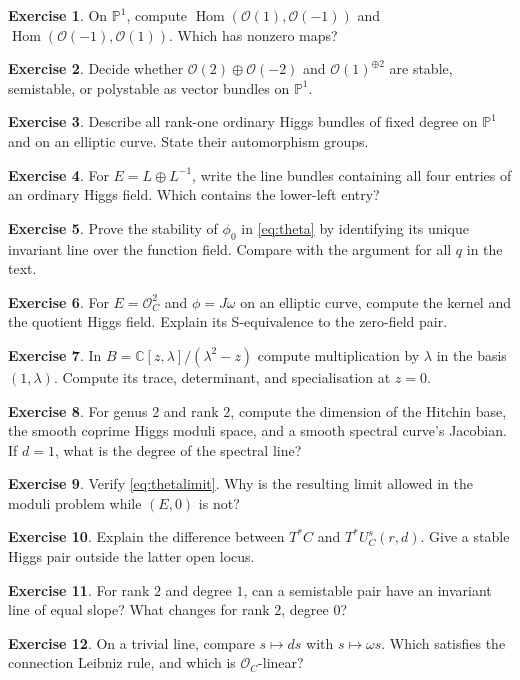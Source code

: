 \documentclass[11pt,a4paper]{article}
\numberwithin{equation}{section}
\theoremstyle{definition}
\newtheorem{exercise}{Exercise}
\newcommand{\OO}{\mathcal O}
\newcommand{\PP}{\mathbb P}
\newcommand{\Hom}{\operatorname{Hom}}
\begin{document}
\begin{exercise}\label{ex:hom}
On $\PP^1$, compute $\Hom(\OO(1),\OO(-1))$ and
$\Hom(\OO(-1),\OO(1))$. Which has nonzero maps?
\end{exercise}
\begin{exercise}\label{ex:bundle}
Decide whether $\OO(2)\oplus\OO(-2)$ and $\OO(1)^{\oplus2}$
are stable, semistable, or polystable as vector bundles on $\PP^1$.
\end{exercise}
\begin{exercise}\label{ex:rankone}
Describe all rank-one ordinary Higgs bundles of fixed degree on
$\PP^1$ and on an elliptic curve. State their automorphism groups.
\end{exercise}
\begin{exercise}\label{ex:matrixentries}
For $E=L\oplus L^{-1}$, write the line bundles containing all four
entries of an ordinary Higgs field. Which contains the lower-left entry?
\end{exercise}
\begin{exercise}\label{ex:theta}
Prove the stability of $\phi_0$ in \eqref{eq:theta} by identifying
its unique invariant line over the function field. Compare with the
argument for all $q$ in the text.
\end{exercise}
\begin{exercise}\label{ex:jordan}
For $E=\OO_C^2$ and $\phi=J\omega$ on an elliptic curve, compute
the kernel and the quotient Higgs field. Explain its S-equivalence
to the zero-field pair.
\end{exercise}
\begin{exercise}\label{ex:spectral}
In $B=\mathbb C[z,\lambda]/(\lambda^2-z)$ compute multiplication
by $\lambda$ in the basis $(1,\lambda)$. Compute its trace,
determinant, and specialisation at $z=0$.
\end{exercise}
\begin{exercise}\label{ex:dim}
For genus $2$ and rank $2$, compute the dimension of the Hitchin
base, the smooth coprime Higgs moduli space, and a smooth spectral
curve's Jacobian. If $d=1$, what is the degree of the spectral line?
\end{exercise}
\begin{exercise}\label{ex:scaling}
Verify \eqref{eq:thetalimit}. Why is the resulting limit allowed in
the moduli problem while $(E,0)$ is not?
\end{exercise}
\begin{exercise}\label{ex:cotangent}
Explain the difference between $T^*C$ and $T^*U_C^s(r,d)$.
Give a stable Higgs pair outside the latter open locus.
\end{exercise}
\begin{exercise}\label{ex:coprime}
For rank $2$ and degree $1$, can a semistable pair have an invariant
line of equal slope? What changes for rank $2$, degree $0$?
\end{exercise}
\begin{exercise}\label{ex:connection}
On a trivial line, compare $s\mapsto ds$ with $s\mapsto\omega s$.
Which satisfies the connection Leibniz rule, and which is $\OO_C$-linear?
\end{exercise}
\end{document}

